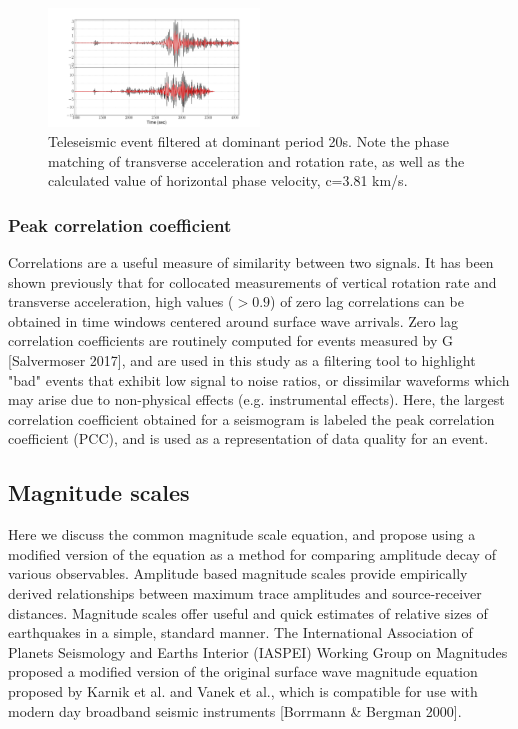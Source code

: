 \documentclass{gji}
\begin{document}


\begin{figure}
\centerline{\includegraphics[width=0.5\textwidth]{rr_ta}}
\caption{Teleseismic event filtered at dominant period 20s. Note the phase matching of transverse acceleration and rotation rate, as well as the calculated value of horizontal phase velocity, c=3.81 km/s.}
\label{fig:rr_ta}
\end{figure}

\subsubsection{Peak correlation coefficient}
Correlations are a useful measure of similarity between two signals. It has been shown previously that for collocated measurements of vertical rotation rate and transverse acceleration, high values ($>0.9$) of zero lag correlations can be obtained in time windows centered around surface wave arrivals. %
Zero lag correlation coefficients are routinely computed for events measured by G [Salvermoser 2017], %
and are used in this study as a filtering tool to highlight "bad" events that exhibit low signal to noise ratios, or dissimilar waveforms which may arise due to non-physical effects (e.g. instrumental effects). Here, the largest correlation coefficient obtained for a seismogram is labeled the peak correlation coefficient (PCC), and is used as a representation of data quality for an event.


\subsection{Magnitude scales}
Here we discuss the common magnitude scale equation, and propose using a modified version of the equation as a method for comparing amplitude decay of various observables. Amplitude based magnitude scales provide empirically derived relationships between maximum trace amplitudes and source-receiver distances. Magnitude scales offer useful and quick estimates of relative sizes of earthquakes in a simple, standard  manner. 
The International Association of Planets Seismology and Earths Interior (IASPEI) Working Group on Magnitudes  proposed a modified version of the original surface wave magnitude equation proposed by Karnik et al. and Vanek et al., %
which is compatible for use with modern day broadband seismic instruments [Borrmann \& Bergman 2000].
\end{document}
